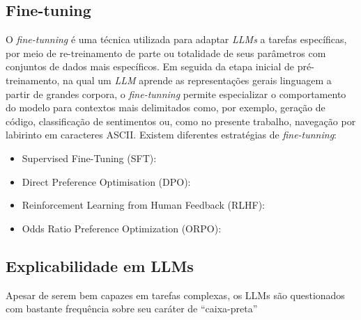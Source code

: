 \documentclass[12pt]{article}
\begin{document}
\subsection{Fine-tuning}

O \textit{fine-tunning} é uma técnica utilizada para adaptar \textit{LLMs} a tarefas específicas, por meio de re-treinamento de parte ou totalidade de seus parâmetros com conjuntos de dados mais específicos. Em seguida da etapa inicial de pré-treinamento, na qual um \textit{LLM} aprende as representações gerais linguagem a partir de grandes corpora, o \textit{fine-tunning} permite especializar o comportamento do modelo para contextos mais delimitados como, por exemplo, geração de código, classificação de sentimentos ou, como no presente trabalho, navegação por labirinto em caracteres ASCII. Existem diferentes estratégias de \textit{fine-tunning}:
\begin{itemize}
    \item Supervised Fine-Tuning (SFT): 
    \item Direct Preference Optimisation (DPO): 
    \item Reinforcement Learning from Human Feedback (RLHF): 
    \item Odds Ratio Preference Optimization (ORPO): 
\end{itemize}

\subsection{Explicabilidade em LLMs}

Apesar de serem bem capazes em tarefas complexas, os LLMs são questionados com bastante frequência sobre seu caráter de ``caixa-preta''




\end{document}
